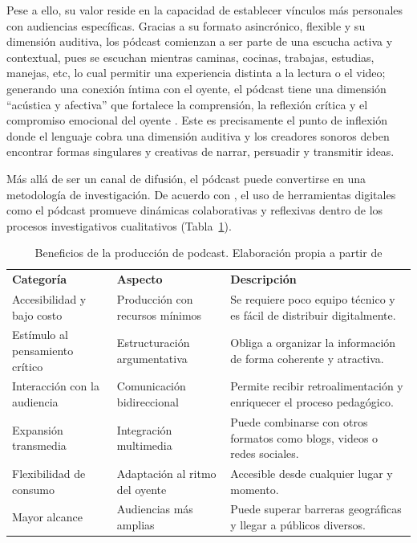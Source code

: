 \documentclass[
  spanish,
  11pt,
  a4paper,
]{scrbook}
\begin{document}
Pese a ello, su valor reside en la capacidad de establecer vínculos más
personales con audiencias específicas. Gracias a su formato asincrónico,
flexible y su dimensión auditiva, los pódcast comienzan a ser parte de
una escucha activa y contextual, pues se escuchan mientras caminas,
cocinas, trabajas, estudias, manejas, etc, lo cual permitir una
experiencia distinta a la lectura o el video; generando una conexión
íntima con el oyente, el pódcast tiene una dimensión ``acústica y
afectiva'' que fortalece la comprensión, la reflexión crítica y el
compromiso emocional del oyente \autocite{Lindgren2016}. Este es
precisamente el punto de inflexión donde el lenguaje cobra una dimensión
auditiva y los creadores sonoros deben encontrar formas singulares y
creativas de narrar, persuadir y transmitir ideas.

Más allá de ser un canal de difusión, el pódcast puede convertirse en
una metodología de investigación. De acuerdo con
\textcite{McLoughlin2010}, el uso de herramientas digitales como el
pódcast promueve dinámicas colaborativas y reflexivas dentro de los
procesos investigativos cualitativos (Tabla~\ref{tbl-1}).

\begingroup
\scriptsize

\begin{longtable}[]{@{}
  >{\raggedright\arraybackslash}p{}
  >{\raggedright\arraybackslash}p{}
  >{\raggedright\arraybackslash}p{}@{}}
\caption{Beneficios de la producción de podcast. Elaboración propia a
partir de \textcite{McLoughlin2010}}\label{tbl-1}\tabularnewline
\toprule\noalign{}
\endfirsthead
\endhead
\bottomrule\noalign{}
\endlastfoot
\textbf{Categoría} & \textbf{Aspecto} & \textbf{Descripción} \\
Accesibilidad y bajo costo & Producción con recursos mínimos & Se
requiere poco equipo técnico y es fácil de distribuir digitalmente. \\
Estímulo al pensamiento crítico & Estructuración argumentativa & Obliga
a organizar la información de forma coherente y atractiva. \\
Interacción con la audiencia & Comunicación bidireccional & Permite
recibir retroalimentación y enriquecer el proceso pedagógico. \\
Expansión transmedia & Integración multimedia & Puede combinarse con
otros formatos como blogs, videos o redes sociales. \\
Flexibilidad de consumo & Adaptación al ritmo del oyente & Accesible
desde cualquier lugar y momento. \\
Mayor alcance & Audiencias más amplias & Puede superar barreras
geográficas y llegar a públicos diversos. \\
\end{longtable}
\end{document}
